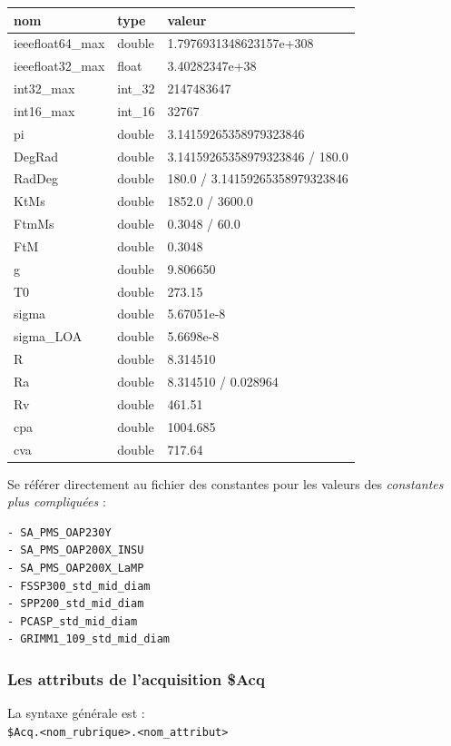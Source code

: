 \label{sec:Cste}
\begin{tabular}{l|l|l}
 nom          & type       & valeur \\
\hline
 ieeefloat64\_max & double  & 1.7976931348623157e+308 \\
 ieeefloat32\_max & float  & 3.40282347e+38 \\
 int32\_max    & int\_32  & 2147483647 \\
 int16\_max    & int\_16  & 32767 \\
 pi           & double  & 3.14159265358979323846 \\
 DegRad       & double  & 3.14159265358979323846 / 180.0 \\
 RadDeg       & double  & 180.0 / 3.14159265358979323846 \\
 KtMs         & double  & 1852.0 / 3600.0 \\
 FtmMs        & double  & 0.3048 / 60.0 \\
 FtM          & double  & 0.3048 \\
 g            & double  & 9.806650 \\
 T0           & double  & 273.15 \\
 sigma        & double  & 5.67051e-8 \\
 sigma\_LOA    & double  & 5.6698e-8 \\
 R            & double  & 8.314510 \\
 Ra           & double  & 8.314510 / 0.028964 \\
 Rv           & double  & 461.51 \\
 cpa          & double  & 1004.685 \\
 cva          & double  & 717.64 \\
\end{tabular}

\medbreak
  Se référer directement au fichier des constantes pour les valeurs des
\textit{constantes plus compliquées} :
\begin{verbatim}
- SA_PMS_OAP230Y
- SA_PMS_OAP200X_INSU
- SA_PMS_OAP200X_LaMP
- FSSP300_std_mid_diam
- SPP200_std_mid_diam
- PCASP_std_mid_diam
- GRIMM1_109_std_mid_diam
\end{verbatim}

\subsubsection{Les attributs de l'acquisition \$Acq}
\label{sec:Acq}
  La syntaxe générale est : \\
\texttt{\$Acq.<nom\_rubrique>.<nom\_attribut>}

